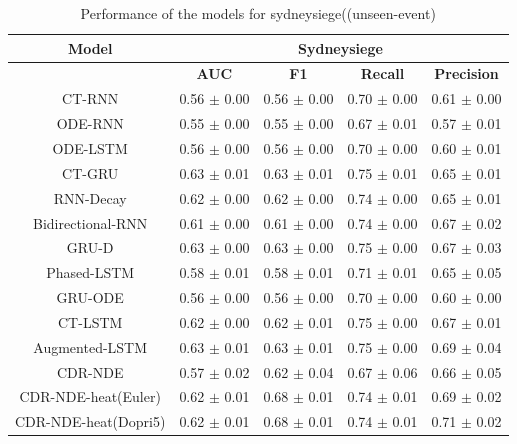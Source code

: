 \documentclass{article} %
\begin{document}
\begin{table}
        \begin{center}
               \begin{tabular}{|c|c|c|c|c|}
                        \hline
                        {\small \textbf{Model}}  & \multicolumn{4}{c|}{\textbf{Sydneysiege} } \\
                        \hline
                         & \textbf{AUC }& \textbf{F1} & \textbf{Recall} & \textbf{Precision} \\
                         \hline
                        CT-RNN & 0.56 $\pm$ 0.00 & 0.56 $\pm$ 0.00 & 0.70 $\pm$ 0.00 & 0.61 $\pm$ 0.00 \\
                        ODE-RNN & 0.55 $\pm$ 0.00 & 0.55 $\pm$ 0.00 & 0.67 $\pm$ 0.01 & 0.57 $\pm$ 0.01 \\
                        ODE-LSTM & 0.56 $\pm$ 0.00 & 0.56 $\pm$ 0.00 & 0.70 $\pm$ 0.00 & 0.60 $\pm$ 0.01 \\
                        CT-GRU & 0.63 $\pm$ 0.01 & 0.63 $\pm$ 0.01 & 0.75 $\pm$ 0.01 & 0.65 $\pm$ 0.01 \\
                        RNN-Decay & 0.62 $\pm$ 0.00 & 0.62 $\pm$ 0.00 & 0.74 $\pm$ 0.00 & 0.65 $\pm$ 0.01 \\
                        Bidirectional-RNN & 0.61 $\pm$ 0.00 & 0.61 $\pm$ 0.00 & 0.74 $\pm$ 0.00 & 0.67 $\pm$ 0.02 \\
                        GRU-D & 0.63 $\pm$ 0.00 & 0.63 $\pm$ 0.00 & 0.75 $\pm$ 0.00 & 0.67 $\pm$ 0.03 \\
                        Phased-LSTM & 0.58 $\pm$ 0.01 & 0.58 $\pm$ 0.01 & 0.71 $\pm$ 0.01 & 0.65 $\pm$ 0.05 \\
                        GRU-ODE & 0.56 $\pm$ 0.00 & 0.56 $\pm$ 0.00 & 0.70 $\pm$ 0.00 & 0.60 $\pm$ 0.00 \\
                        CT-LSTM & 0.62 $\pm$ 0.00 & 0.62 $\pm$ 0.01 & 0.75 $\pm$ 0.00 & 0.67 $\pm$ 0.01 \\
                        Augmented-LSTM & 0.63 $\pm$ 0.01 & 0.63 $\pm$ 0.01 & 0.75 $\pm$ 0.00 & 0.69 $\pm$ 0.04 \\
                        \hline
                        CDR-NDE  & 0.57 $\pm$ 0.02 & 0.62 $\pm$ 0.04 & 0.67 $\pm$ 0.06 & 0.66 $\pm$ 0.05 \\ 
CDR-NDE-heat(Euler) & 0.62 $\pm$ 0.01 & 0.68 $\pm$ 0.01 & 0.74 $\pm$ 0.01 & 0.69 $\pm$ 0.02 \\ 
CDR-NDE-heat(Dopri5) & 0.62 $\pm$ 0.01 & 0.68 $\pm$ 0.01 & 0.74 $\pm$ 0.01 & 0.71 $\pm$ 0.02 \\ \hline
                \end{tabular}
        \end{center}
        \caption{Performance of the models for sydneysiege((unseen-event)}
        \label{tab:sydneysiege_unseen}
\end{table}
\end{document}
